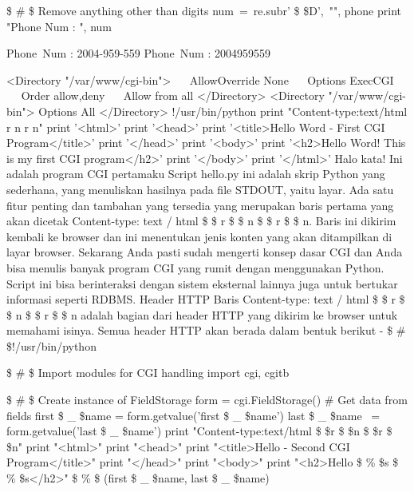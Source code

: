  \$  \#  \$ Remove anything other than digits 
\noindent 
num~=~re.sub{r' \$  \setminus  \$D',~"", phone}     
print "Phone Num : ", num 
\begin{12pt}
\item 
Phone~Num :  2004-959-559 
Phone~Num :  2004959559 
\begin{12pt}
<Directory "/var/www/cgi-bin"> 
~~ AllowOverride None  
~~ Options ExecCGI  
~~ Order allow,deny 
~~ Allow from all 
</Directory> 
\vspace{12pt}
<Directory "/var/www/cgi-bin"> 
Options All
</Directory> 
!/usr/bin/python 
print "Content-type:text/html   \setminus  r   \setminus  n   \setminus  r   \setminus  n" 
print '<html>' 
print '<head>' 
print '<title>Hello Word - First CGI Program</title>' 
print '</head>' 
print '<body>' 
print '<h2>Hello Word! This is my first CGI program</h2>' 
print '</body>' 
print '</html>' 
Halo kata! Ini adalah program CGI pertamaku 
Script hello.py ini adalah skrip Python yang sederhana, yang menuliskan hasilnya pada file STDOUT, yaitu layar. Ada satu fitur penting dan tambahan yang tersedia yang merupakan baris pertama yang akan dicetak Content-type: text / html  \$  \setminus  \$ r  \$  \setminus  \$ n  \$  \setminus  \$ r  \$  \setminus  \$ n. Baris ini dikirim kembali ke browser dan ini menentukan jenis konten yang akan ditampilkan di layar browser. Sekarang Anda pasti sudah mengerti konsep dasar CGI dan Anda bisa menulis banyak program CGI yang rumit dengan menggunakan Python. Script ini bisa berinteraksi dengan sistem eksternal lainnya juga untuk bertukar informasi seperti RDBMS. 
Header HTTP 
Baris Content-type: text / html  \$  \setminus  \$ r  \$  \setminus  \$ n  \$  \setminus  \$ r  \$  \setminus  \$ n adalah bagian dari header HTTP yang dikirim ke browser untuk memahami isinya. Semua header HTTP akan berada dalam bentuk berikut - 
 \$  \#  \$!/usr/bin/python \par
 \$  \#  \$ Import modules for CGI handling   
import cgi, cgitb  \par
 \$  \#  \$ Create instance of FieldStorage 
form = cgi.FieldStorage()  
   \#   Get data from fields 
first \$  \_  \$name = form.getvalue('first \$  \_  \$name') 
last \$  \_  \$name~ = form.getvalue('last \$  \_  \$name') 
print "Content-type:text/html \$  \setminus  \$r \$  \setminus  \$n \$  \setminus  \$r \$  \setminus  \$n" 
print "<html>" 
print "<head>" 
print "<title>Hello - Second CGI Program</title>" 
print "</head>" 
print "<body>" 
print "<h2>Hello  \$  \%  \$s  \$  \%  \$s</h2>"  \$  \%  \$ (first \$  \_  \$name, last \$  \_  \$name) 

\end{12pt}
\end{12pt}
